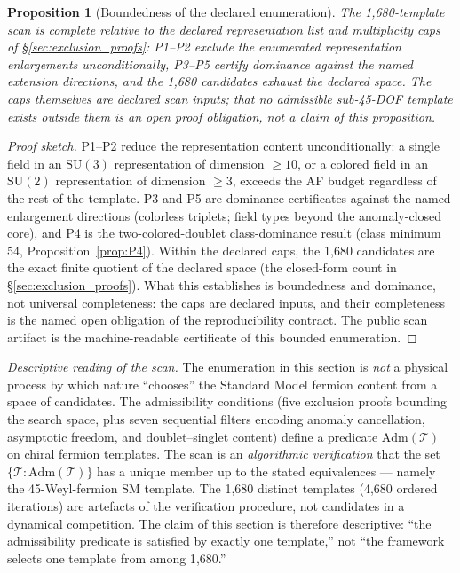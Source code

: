 \documentclass[11pt]{article}
\newtheorem{proposition}[theorem]{Proposition}
\theoremstyle{definition}
\newcommand{\SU}{\mathrm{SU}}
\begin{document}
\begin{proposition}[Boundedness of the declared enumeration]
\label{prop:scan_completeness_v35}
The 1{,}680-template scan is complete relative to the declared
representation list and multiplicity caps of
\S\ref{sec:exclusion_proofs}: P1--P2 exclude the enumerated
representation enlargements unconditionally, P3--P5 certify dominance
against the named extension directions, and the 1{,}680 candidates
exhaust the declared space.  The caps themselves are declared scan
inputs; that no admissible sub-45-DOF template exists outside them is
an open proof obligation, not a claim of this proposition.
\end{proposition}

\begin{proof}[Proof sketch]
P1--P2 reduce the representation content unconditionally: a single
field in an $\SU(3)$ representation of dimension $\ge 10$, or a
colored field in an $\SU(2)$ representation of dimension $\ge 3$,
exceeds the AF budget regardless of the rest of the template.  P3 and
P5 are dominance certificates against the named enlargement
directions (colorless triplets; field types beyond the anomaly-closed
core), and P4 is the two-colored-doublet class-dominance result
(class minimum 54, Proposition~\ref{prop:P4}).  Within the declared
caps, the 1{,}680 candidates are the exact finite quotient of the
declared space (the closed-form count in
\S\ref{sec:exclusion_proofs}).  What this establishes is boundedness
and dominance, not universal completeness: the caps are declared
inputs, and their completeness is the named open obligation of the
reproducibility contract.  The public scan artifact is the
machine-readable certificate of this bounded enumeration.
\end{proof}

\smallskip\noindent\textit{Descriptive reading of the scan.}\quad
The enumeration in this section is \emph{not} a physical process by
which nature ``chooses'' the Standard Model fermion content from a
space of candidates.  The admissibility conditions (five exclusion
proofs bounding the search space, plus seven sequential filters
encoding anomaly cancellation, asymptotic freedom, and
doublet--singlet content)
define a predicate
$\mathrm{Adm}(\mathcal{T})$ on chiral fermion templates.  The scan
is an \emph{algorithmic verification} that the set
$\{\mathcal{T} : \mathrm{Adm}(\mathcal{T})\}$ has a unique member up
to the stated equivalences --- namely the 45-Weyl-fermion SM
template.  The 1{,}680 distinct templates (4{,}680 ordered
iterations) are artefacts of the verification procedure, not
candidates in a dynamical competition.  The claim of this section is
therefore descriptive: ``the admissibility predicate is satisfied by
exactly one template,'' not ``the framework selects one template
from among 1{,}680.''
\end{document}
